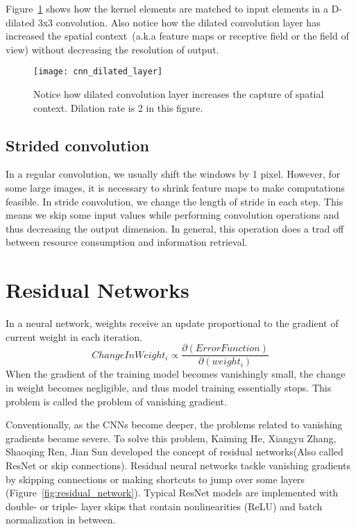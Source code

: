     Figure~\ref{fig:dilated_layer} shows how the kernel elements are matched to input elements in a D-dilated 3x3 convolution. Also notice how the dilated convolution layer has increased the spatial context~(a.k.a feature maps or receptive field or the field of view) without decreasing the resolution of output.
    \begin{figure}[h!]
        \centering
        \texttt{[image: cnn\_dilated\_layer]}
        \caption[Dilated convolution layer]{Notice how dilated convolution layer increases the capture of spatial context. Dilation rate is 2 in this figure.}
        \label{fig:dilated_layer}
    \end{figure}


\subsection{Strided convolution}
    In a regular convolution, we usually shift the windows by 1 pixel. However, for some large images, it is necessary to shrink feature maps to make computations feasible. In stride convolution, we change the length of stride in each step. This means we skip some input values while performing convolution operations and thus decreasing the output dimension. In general, this operation does a trad off between resource consumption and information retrieval.


\section[Residual Networks]{Residual Networks}

In a neural network, weights receive an update proportional to the gradient of current weight in each iteration. \begin{equation} ChangeInWeight_{i} \propto \frac{\partial(ErrorFunction)}{\partial(weight_{i})} \end{equation} When the gradient of the training model becomes vanishingly small, the change in weight becomes negligible, and thus model training essentially stops. This problem is called the problem of vanishing gradient.

Conventionally, as the CNNs become deeper, the problems related to vanishing gradients became severe. To solve this problem, {Kaiming He, Xiangyu Zhang, Shaoqing Ren, Jian Sun}\cite{ResNet} developed the concept of residual networks(Also called ResNet or skip connections). Residual neural networks tackle vanishing gradients by skipping connections or making shortcuts to jump over some layers (Figure~\ref{fig:residual_network}). Typical ResNet models are implemented with double- or triple- layer skips that contain nonlinearities (ReLU) and batch normalization in between.

